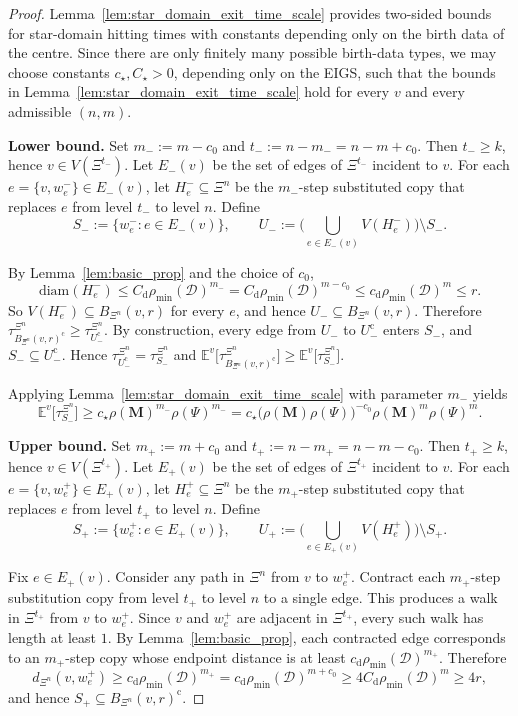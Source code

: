 \documentclass{article}
\theoremstyle{plain}
\theoremstyle{definition}
\newcommand{\dist}{\mathrm{d}}
\newcommand{\diam}{\mathrm{diam}}
\begin{document}
\begin{proof}
Lemma~\ref{lem:star_domain_exit_time_scale} provides two-sided bounds for star-domain hitting times with constants depending only on the birth data of the centre.
Since there are only finitely many possible birth-data types, we may choose constants $c_{\star},C_{\star}>0$, depending only on the EIGS, such that the bounds in Lemma~\ref{lem:star_domain_exit_time_scale} hold for every $v$ and every admissible $(n,m)$.

\textbf{Lower bound.}
Set $m_-:=m-c_0$ and $t_-:=n-m_-=n-m+c_0$.
Then $t_-\ge k$, hence $v\in V(\Xi^{t_-})$.
Let $E_-(v)$ be the set of edges of $\Xi^{t_-}$ incident to $v$.
For each $e=\{v,w_e^-\}\in E_-(v)$, let $H_e^-\subseteq \Xi^n$ be the $m_-$-step substituted copy that replaces $e$ from level $t_-$ to level $n$.
Define
\[
S_-:=\{w_e^-:e\in E_-(v)\},
\qquad
U_-:=\Big(\bigcup_{e\in E_-(v)}V(H_e^-)\Big)\setminus S_-.
\]

By Lemma~\ref{lem:basic_prop} and the choice of $c_0$,
\[
\diam(H_e^-)
\le
C_{\dist}\rho_{\min}(\mathcal D)^{m_-}
=
C_{\dist}\rho_{\min}(\mathcal D)^{m-c_0}
\le
c_{\dist}\rho_{\min}(\mathcal D)^m
\le
r.
\]
So $V(H_e^-)\subseteq B_{\Xi^n}(v,r)$ for every $e$, and hence $U_-\subseteq B_{\Xi^n}(v,r)$.
Therefore
$
\tau_{B_{\Xi^n}(v,r)^{\mathrm c}}^{\Xi^n}\ge \tau_{U_-^{\mathrm c}}^{\Xi^n}.
$
By construction, every edge from $U_-$ to $U_-^{\mathrm c}$ enters $S_-$, and $S_-\subseteq U_-^{\mathrm c}$.
Hence $\tau_{U_-^{\mathrm c}}^{\Xi^n}=\tau_{S_-}^{\Xi^n}$ and
$
\mathbb E^v\big[\tau_{B_{\Xi^n}(v,r)^{\mathrm c}}^{\Xi^n}\big]
\ge
\mathbb E^v\big[\tau_{S_-}^{\Xi^n}\big].
$

Applying Lemma~\ref{lem:star_domain_exit_time_scale} with parameter $m_-$ yields
\[
\mathbb E^v\big[\tau_{S_-}^{\Xi^n}\big]
\ge
c_{\star}\rho(\mathbf M)^{m_-}\rho(\Psi)^{m_-}
=
c_{\star}\big(\rho(\mathbf M)\rho(\Psi)\big)^{-c_0}\rho(\mathbf M)^m\rho(\Psi)^m.
\]

\textbf{Upper bound.}
Set $m_+:=m+c_0$ and $t_+:=n-m_+=n-m-c_0$.
Then $t_+\ge k$, hence $v\in V(\Xi^{t_+})$.
Let $E_+(v)$ be the set of edges of $\Xi^{t_+}$ incident to $v$.
For each $e=\{v,w_e^+\}\in E_+(v)$, let $H_e^+\subseteq \Xi^n$ be the $m_+$-step substituted copy that replaces $e$ from level $t_+$ to level $n$.
Define
\[
S_+:=\{w_e^+:e\in E_+(v)\},
\qquad
U_+:=\Big(\bigcup_{e\in E_+(v)}V(H_e^+)\Big)\setminus S_+.
\]

Fix $e\in E_+(v)$.
Consider any path in $\Xi^n$ from $v$ to $w_e^+$.
Contract each $m_+$-step substitution copy from level $t_+$ to level $n$ to a single edge.
This produces a walk in $\Xi^{t_+}$ from $v$ to $w_e^+$.
Since $v$ and $w_e^+$ are adjacent in $\Xi^{t_+}$, every such walk has length at least $1$.
By Lemma~\ref{lem:basic_prop}, each contracted edge corresponds to an $m_+$-step copy whose endpoint distance is at least
$
c_{\dist}\rho_{\min}(\mathcal D)^{m_+}.
$
Therefore
\[
d_{\Xi^n}(v,w_e^+)
\ge
c_{\dist}\rho_{\min}(\mathcal D)^{m_+}
=
c_{\dist}\rho_{\min}(\mathcal D)^{m+c_0}
\ge
4C_{\dist}\rho_{\min}(\mathcal D)^m
\ge
4r,
\]
and hence $S_+\subseteq B_{\Xi^n}(v,r)^{\mathrm c}$.


\end{proof}
\end{document}
